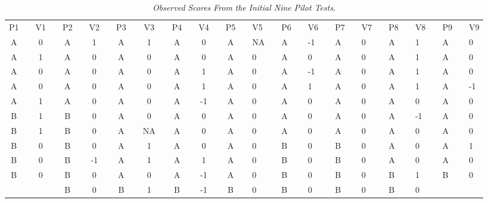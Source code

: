 \documentclass{article}
\begin{document}
  \begin{table}

  \caption{\emph{Observed }\emph{Scores }\emph{From} \emph{the} \emph{Initial Nine} \emph{Pilot Tests.} }
\label{Table 2}

  \begin{tabular}{c  c  c  c  c  c  c  c  c  c  c  c  c  c  c  c  c  c}

  P1 &   & V1 &   & P2 &   & V2 &   & P3 &   & V3 &   & P4 &   & V4 &   & P5 &   & V5 &   & P6 &   & V6 &   & P7 &   & V7 &   & P8 &   & V8 &   & P9 &   & V9 &  \\
A &   & 0 &   & A &   & 1 &   & A &   & 1 &   & A &   & 0 &   & A &   & NA &   & A &   & -1 &   & A &   & 0 &   & A &   & 1 &   & A &   & 0 &  \\
A &   & 1 &   & A &   & 0 &   & A &   & 0 &   & A &   & 0 &   & A &   & 0 &   & A &   & 0 &   & A &   & 0 &   & A &   & 1 &   & A &   & 0 &  \\
A &   & 0 &   & A &   & 0 &   & A &   & 0 &   & A &   & 1 &   & A &   & 0 &   & A &   & -1 &   & A &   & 0 &   & A &   & 1 &   & A &   & 0 &  \\
A &   & 0 &   & A &   & 0 &   & A &   & 0 &   & A &   & 1 &   & A &   & 0 &   & A &   & 1 &   & A &   & 0 &   & A &   & 1 &   & A &   & -1 &  \\
A &   & 1 &   & A &   & 0 &   & A &   & 0 &   & A &   & -1 &   & A &   & 0 &   & A &   & 0 &   & A &   & 0 &   & A &   & 0 &   & A &   & 0 &  \\
B &   & 1 &   & B &   & 0 &   & A &   & 0 &   & A &   & 0 &   & A &   & 0 &   & A &   & 0 &   & A &   & 0 &   & A &   & -1 &   & A &   & 0 &  \\
B &   & 1 &   & B &   & 0 &   & A &   & NA &   & A &   & 0 &   & A &   & 0 &   & A &   & 0 &   & A &   & 0 &   & A &   & 0 &   & A &   & 0 &  \\
B &   & 0 &   & B &   & 0 &   & A &   & 1 &   & A &   & 0 &   & A &   & 0 &   & B &   & 0 &   & B &   & 0 &   & A &   & 0 &   & A &   & 1 &  \\
B &   & 0 &   & B &   & -1 &   & A &   & 1 &   & A &   & 1 &   & A &   & 0 &   & B &   & 0 &   & B &   & 0 &   & A &   & 0 &   & A &   & 0 &  \\
B &   & 0 &   & B &   & 0 &   & A &   & 0 &   & A &   & -1 &   & A &   & 0 &   & B &   & 0 &   & B &   & 0 &   & B &   & 1 &   & B &   & 0 &  \\
 &  &  &  & B &   & 0 &   & B &   & 1 &   & B &   & -1 &   & B &   & 0 &   & B &   & 0 &   & B &   & 0 &   & B &   & 0 &  \\

\end{tabular}
\end{table}
\end{document}
